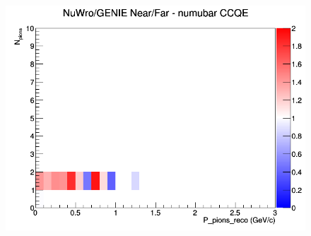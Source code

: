 \documentclass[12pt]{article}
\begin{document}
\begin{figure}[h]
\endminipage
{}
\includegraphics[width=\linewidth]{eff_N_P/GAr/pions/ratios/CCQE_NuWro_GENIE_numubar_NF_N_P.png}
\endminipage
\newline
\end{figure}
\clearpage
\end{document}
